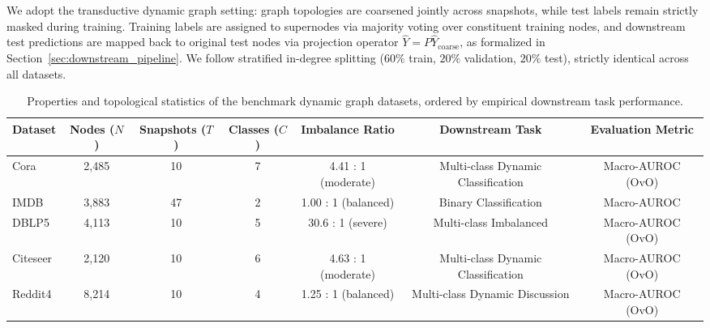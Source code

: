 \documentclass[sigconf]{acmart}
\begin{document}
We adopt the transductive dynamic graph setting: graph topologies are coarsened jointly across snapshots, while test labels remain strictly masked during training. Training labels are assigned to supernodes via majority voting over constituent training nodes, and downstream test predictions are mapped back to original test nodes via projection operator $\widehat{Y} = P \widehat{Y}_{\text{coarse}}$, as formalized in Section~\ref{sec:downstream_pipeline}. We follow stratified in-degree splitting ($60\%$ train, $20\%$ validation, $20\%$ test), strictly identical across all datasets.

\begin{table}[t]
\centering
\caption{Properties and topological statistics of the benchmark dynamic graph datasets, ordered by empirical downstream task performance.}
\label{tab:datasets}
\small
\begin{tabular*}{\textwidth}{@{\extracolsep{\fill}}lcccccc@{}}
\toprule
\textbf{Dataset} & \textbf{Nodes ($N$)} & \textbf{Snapshots ($T$)} & \textbf{Classes ($C$)} & \textbf{Imbalance Ratio} & \textbf{Downstream Task} & \textbf{Evaluation Metric} \\
\midrule
Cora     & 2,485 & 10 & 7 & 4.41 : 1 (moderate)  & Multi-class Dynamic Classification & Macro-AUROC (OvO) \\
IMDB     & 3,883 & 47 & 2 & 1.00 : 1 (balanced)  & Binary Classification              & Macro-AUROC       \\
DBLP5    & 4,113 & 10 & 5 & 30.6 : 1 (severe)    & Multi-class Imbalanced             & Macro-AUROC (OvO) \\
Citeseer & 2,120 & 10 & 6 & 4.63 : 1 (moderate)  & Multi-class Dynamic Classification & Macro-AUROC (OvO) \\
Reddit4  & 8,214 & 10 & 4 & 1.25 : 1 (balanced)  & Multi-class Dynamic Discussion     & Macro-AUROC (OvO) \\
\bottomrule
\end{tabular*}
\end{table}
\end{document}
